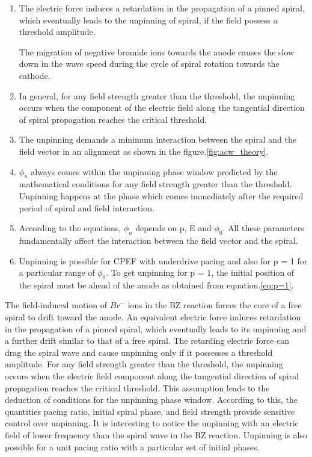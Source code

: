 \documentclass[%
 preprint,
 amsmath,amssymb,
 aps,
]{revtex4-2}
\begin{document}
\begin{enumerate}
    \item The electric force induces a retardation in the propagation of a pinned spiral, which eventually leads to the unpinning of spiral, if the field possess a threshold amplitude. 
    
    The migration of negative bromide ions towards the anode causes the slow down in the wave speed during the cycle of spiral rotation towards the cathode.
    
    \item In general, for any field strength greater than the threshold, the unpinning occurs when the component of the electric field along the tangential direction of spiral propagation reaches the critical threshold.
    
    \item The unpinning demands a minimum interaction between the spiral and the field vector in an alignment as shown in the figure.\ref{fig:acw_theory}.
    
    \item $\phi_u$ always comes within the unpinning phase window predicted by the mathematical conditions for any field strength greater than the threshold.
   Unpinning happens at the phase which comes immediately after the required period of spiral and field interaction.
    
    \item According to the equations, $\phi_u$ depends on p, E and $\phi_0$. All these parameters fundamentally affect the interaction between the field vector and the spiral. 
    
    \item Unpinning is possible for CPEF with underdrive pacing and also for p = 1 for a particular range of $\phi_0$. To get unpinning for p = 1, the initial position of the spiral must be ahead of the anode as obtained from equation.\ref{eq:p=1}.
\end{enumerate}



The field-induced motion of $Br^-$ ions in the BZ reaction forces the core of a free spiral to drift toward the anode. An equivalent electric force induces retardation in the propagation of a pinned spiral, which eventually leads to its unpinning and a further drift similar to that of a free spiral. The retarding electric force can drag the spiral wave and cause unpinning only if it possesses a threshold amplitude. 
For any field strength greater than the threshold, the unpinning occurs when the electric field component along the tangential direction of spiral propagation reaches the critical threshold. This assumption leads to the deduction of conditions for the unpinning phase window.
According to this, the quantities pacing ratio, initial spiral phase, and field strength provide sensitive control over unpinning. It is interesting to notice the unpinning with an electric field of lower frequency than the spiral wave in the BZ reaction. Unpinning is also possible for a unit pacing ratio with a particular set of initial phases. 
\end{document}

